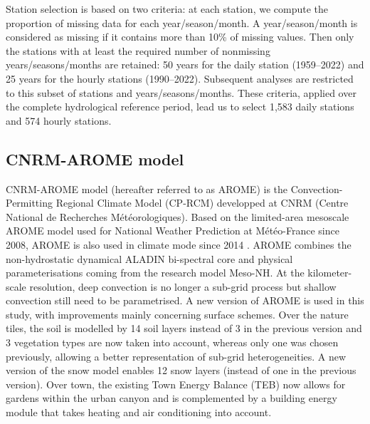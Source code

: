 \documentclass[hess, manuscript]{copernicus}
\begin{document}
Station selection is based on two criteria: at each station, we compute the proportion of missing data for each year/season/month. A year/season/month is considered as missing if it contains more than 10\% of missing values. Then only the stations with at least the required number of nonmissing years/seasons/months are retained: 50 years for the daily station (1959--2022) and 25 years for the hourly stations (1990--2022). Subsequent
analyses are restricted to this subset of stations and years/seasons/months. These criteria, applied over the complete hydrological reference period, lead us to select 1,583 daily stations and 574 hourly stations.

\subsection{CNRM-AROME model}\label{arome-model}

CNRM-AROME model (hereafter referred to as AROME) is the Convection-Permitting Regional Climate Model (CP-RCM) developped at CNRM (Centre National de Recherches Météorologiques). Based on the limited-area mesoscale AROME model \citep{seity-etal-2011} used for National Weather Prediction at Météo-France since 2008, AROME is also used in climate mode since 2014 \citep{Caillaud2021,lucaspicher-etal-2024}.
AROME combines the non-hydrostatic dynamical ALADIN bi-spectral core and physical parameterisations coming from the research model Meso-NH. At the kilometer-scale resolution, deep convection is no longer a sub-grid process but shallow convection still need to be parametrised. A new version of AROME is used in this study, with improvements mainly concerning surface schemes. Over the nature tiles, the soil is modelled by 14 soil layers instead of 3 in the previous version and 3 vegetation types are now taken into account, whereas only one was chosen previously, allowing a better representation of sub-grid heterogeneities. A new version of the snow model enables 12 snow layers (instead of one in the previous version). Over town, the existing Town Energy Balance (TEB) \citep{masson-2000} now allows for gardens within the urban canyon and is complemented by a building energy module that takes heating and air conditioning into account.
\end{document}
